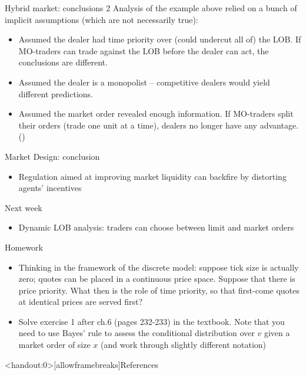 \documentclass[english,10pt
,aspectratio=169
]{beamer}
\begin{document}
\begin{frame}{Hybrid market: conclusions 2}
	Analysis of the example above relied on a bunch of implicit \alert{assumptions} (which are not necessarily true):
	\begin{itemize}
		\item Assumed the dealer had time priority over (could undercut all of) the LOB. If MO-traders can trade against the LOB before the dealer can act, the conclusions are different.
		\item Assumed the dealer is a monopolist -- competitive dealers would yield different predictions.
		\item Assumed the market order revealed enough information. If MO-traders split their orders (trade one unit at a time), dealers no longer have any advantage. (\cite{back_working_2007})
	\end{itemize}
\end{frame}


\begin{frame}{Market Design: conclusion}
	\begin{itemize}
		\item Regulation aimed at improving market liquidity can backfire by distorting agents' incentives
	\end{itemize}
\end{frame}




\begin{frame}{Next week}
	\begin{itemize}
		\item Dynamic LOB analysis: traders can choose between limit and market orders
	\end{itemize}
\end{frame}


\begin{frame}{Homework}
	\begin{itemize}
		\item Thinking in the framework of the discrete model: suppose tick size is actually zero; quotes can be placed in a continuous price space. Suppose that there is price priority. What then is the role of time priority, so that first-come quotes at identical prices are served first?
		\item Solve exercise 1 after ch.6 (pages 232-233) in the textbook. Note that you need to use Bayes' rule to assess the conditional distribution over $v$ given a market order of size $x$ (and work through slightly different notation)
	\end{itemize}
\end{frame}





\appendix
\begin{frame}<handout:0>[allowframebreaks]{References}
	
	
\end{frame}
\end{document}

